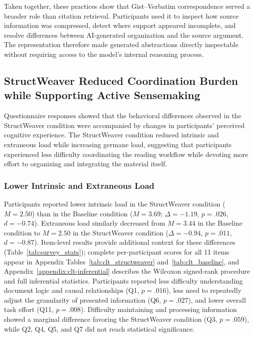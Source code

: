 \documentclass[manuscript,review,anonymous]{acmart}
\begin{document}
Taken together, these practices show that Gist--Verbatim correspondence served a broader role than citation retrieval. Participants used it to inspect how source information was compressed, detect where support appeared incomplete, and resolve differences between AI-generated organization and the source argument. The representation therefore made generated abstractions directly inspectable without requiring access to the model's internal reasoning process.

\subsection{StructWeaver Reduced Coordination Burden while Supporting Active Sensemaking}
\label{sec:cognitive-findings}

Questionnaire responses showed that the behavioral differences observed in the StructWeaver condition were accompanied by changes in participants' perceived cognitive experience. The StructWeaver condition reduced intrinsic and extraneous load while increasing germane load, suggesting that participants experienced less difficulty coordinating the reading workflow while devoting more effort to organizing and integrating the material itself.

\subsubsection{Lower Intrinsic and Extraneous Load}

Participants reported lower intrinsic load in the StructWeaver condition ($M=2.50$) than in the Baseline condition ($M=3.69$; $\Delta=-1.19$, $p=.026$, $d=-0.74$). Extraneous load similarly decreased from $M=3.44$ in the Baseline condition to $M=2.50$ in the StructWeaver condition ($\Delta=-0.94$, $p=.011$, $d=-0.87$). Item-level results provide additional context for these differences (Table~\ref{tab:survey_stats}); complete per-participant scores for all 11 items appear in Appendix Tables~\ref{tab:clt_structweaver} and~\ref{tab:clt_baseline}, and Appendix~\ref{appendix:clt-inferential} describes the Wilcoxon signed-rank procedure and full inferential statistics. Participants reported less difficulty understanding document logic and causal relationships (Q1, $p=.016$), less need to repeatedly adjust the granularity of presented information (Q6, $p=.027$), and lower overall task effort (Q11, $p=.008$). Difficulty maintaining and processing information showed a marginal difference favoring the StructWeaver condition (Q3, $p=.059$), while Q2, Q4, Q5, and Q7 did not reach statistical significance.
\end{document}
